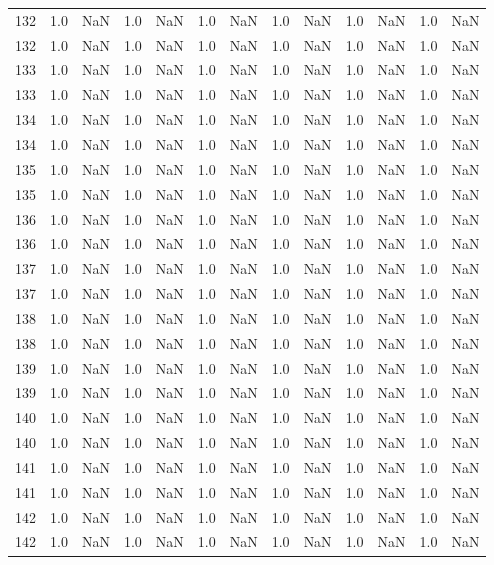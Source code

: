 \begin{tabular}{lrrrrrrrrrrrr}
132 & 1.0 & NaN & 1.0 & NaN & 1.0 & NaN & 1.0 & NaN & 1.0 & NaN & 1.0 & NaN \\
132 & 1.0 & NaN & 1.0 & NaN & 1.0 & NaN & 1.0 & NaN & 1.0 & NaN & 1.0 & NaN \\
133 & 1.0 & NaN & 1.0 & NaN & 1.0 & NaN & 1.0 & NaN & 1.0 & NaN & 1.0 & NaN \\
133 & 1.0 & NaN & 1.0 & NaN & 1.0 & NaN & 1.0 & NaN & 1.0 & NaN & 1.0 & NaN \\
134 & 1.0 & NaN & 1.0 & NaN & 1.0 & NaN & 1.0 & NaN & 1.0 & NaN & 1.0 & NaN \\
134 & 1.0 & NaN & 1.0 & NaN & 1.0 & NaN & 1.0 & NaN & 1.0 & NaN & 1.0 & NaN \\
135 & 1.0 & NaN & 1.0 & NaN & 1.0 & NaN & 1.0 & NaN & 1.0 & NaN & 1.0 & NaN \\
135 & 1.0 & NaN & 1.0 & NaN & 1.0 & NaN & 1.0 & NaN & 1.0 & NaN & 1.0 & NaN \\
136 & 1.0 & NaN & 1.0 & NaN & 1.0 & NaN & 1.0 & NaN & 1.0 & NaN & 1.0 & NaN \\
136 & 1.0 & NaN & 1.0 & NaN & 1.0 & NaN & 1.0 & NaN & 1.0 & NaN & 1.0 & NaN \\
137 & 1.0 & NaN & 1.0 & NaN & 1.0 & NaN & 1.0 & NaN & 1.0 & NaN & 1.0 & NaN \\
137 & 1.0 & NaN & 1.0 & NaN & 1.0 & NaN & 1.0 & NaN & 1.0 & NaN & 1.0 & NaN \\
138 & 1.0 & NaN & 1.0 & NaN & 1.0 & NaN & 1.0 & NaN & 1.0 & NaN & 1.0 & NaN \\
138 & 1.0 & NaN & 1.0 & NaN & 1.0 & NaN & 1.0 & NaN & 1.0 & NaN & 1.0 & NaN \\
139 & 1.0 & NaN & 1.0 & NaN & 1.0 & NaN & 1.0 & NaN & 1.0 & NaN & 1.0 & NaN \\
139 & 1.0 & NaN & 1.0 & NaN & 1.0 & NaN & 1.0 & NaN & 1.0 & NaN & 1.0 & NaN \\
140 & 1.0 & NaN & 1.0 & NaN & 1.0 & NaN & 1.0 & NaN & 1.0 & NaN & 1.0 & NaN \\
140 & 1.0 & NaN & 1.0 & NaN & 1.0 & NaN & 1.0 & NaN & 1.0 & NaN & 1.0 & NaN \\
141 & 1.0 & NaN & 1.0 & NaN & 1.0 & NaN & 1.0 & NaN & 1.0 & NaN & 1.0 & NaN \\
141 & 1.0 & NaN & 1.0 & NaN & 1.0 & NaN & 1.0 & NaN & 1.0 & NaN & 1.0 & NaN \\
142 & 1.0 & NaN & 1.0 & NaN & 1.0 & NaN & 1.0 & NaN & 1.0 & NaN & 1.0 & NaN \\
142 & 1.0 & NaN & 1.0 & NaN & 1.0 & NaN & 1.0 & NaN & 1.0 & NaN & 1.0 & NaN \\

\end{tabular}
